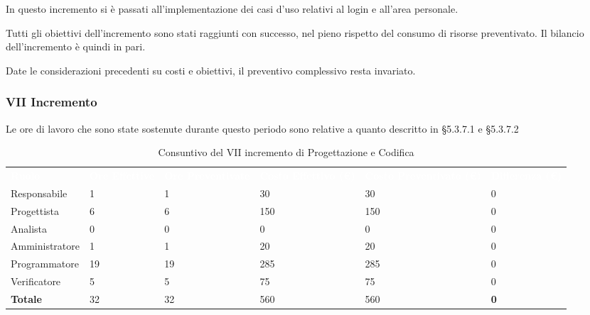 In questo incremento si è passati all'implementazione dei casi d'uso relativi al login e all'area personale.

Tutti gli obiettivi dell’incremento sono stati raggiunti con successo, nel pieno rispetto del consumo di risorse preventivato. Il bilancio dell’incremento è quindi in pari.

Date le considerazioni precedenti su costi e obiettivi, il preventivo complessivo resta invariato.


\pagebreak


\subsubsection{VII Incremento}
Le ore di lavoro che sono state sostenute durante questo periodo sono relative a quanto descritto in §5.3.7.1 e §5.3.7.2

\begin{table}[H]
\begin{center}
\renewcommand{\arraystretch}{1.5}
\begin{tabular}{ m{}<{\centering}  m{}<{\centering} m{}<{\centering} m{}<{\centering} m{}<{\centering} m{}<{\centering}}	\rowcolor{darkblue}
	\textcolor{white}{\textbf{Ruolo}} & \textcolor{white}{\textbf{Ore Effettive}} & \textcolor{white}{\textbf{Ore Preventivate}}&\textcolor{white}{\textbf{Costo Effettivo (\euro)}}&\textcolor{white}{\textbf{Costo Preventivato (\euro)}}&\textcolor{white}{\textbf{Differenza (\euro)}}\\ 

	Responsabile  & 1 & 1 & 30 & 30 & 0\\	
	
	Progettista & 6 & 6 & 150 & 150 & 0\\
	
	Analista & 0 & 0 & 0 & 0 & 0\\
	
	Amministratore & 1 & 1 & 20 & 20 & 0\\
	
	Programmatore & 19 & 19 & 285 & 285 & 0\\
	
	Verificatore & 5 & 5 & 75 & 75 & 0\\
	
	\textbf{Totale} & 32 & 32 & 560 & 560 & \textbf{0} \\
	
\end{tabular}
\caption{Consuntivo del VII incremento di Progettazione e Codifica}
\end{center}
\end{table}


